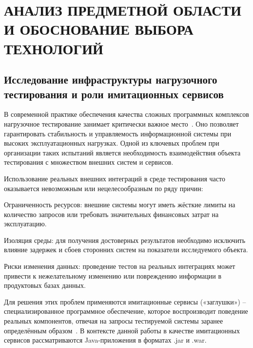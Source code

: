 ﻿\chapter{{\fontsize{14pt}{21pt}\selectfont\MakeUppercase{АНАЛИЗ ПРЕДМЕТНОЙ ОБЛАСТИ И ОБОСНОВАНИЕ ВЫБОРА ТЕХНОЛОГИЙ}}}
\label{cha:analysis}


\section{Исследование инфраструктуры нагрузочного тестирования и роли имитационных сервисов}

В современной практике обеспечения качества сложных программных комплексов нагрузочное тестирование занимает критически важное место~\cite{gost-56920-2024, kulikov-testing}. Оно позволяет гарантировать стабильность и управляемость информационной системы при высоких эксплуатационных нагрузках. Одной из ключевых проблем при организации таких испытаний является необходимость взаимодействия объекта тестирования с множеством внешних систем и сервисов.

Использование реальных внешних интеграций в среде тестирования часто оказывается невозможным или нецелесообразным по ряду причин:

\begin{compactlist}
\item Ограниченность ресурсов: внешние системы могут иметь жёсткие лимиты на количество запросов или требовать значительных финансовых затрат на эксплуатацию.
\item Изоляция среды: для получения достоверных результатов необходимо исключить влияние задержек и сбоев сторонних систем на показатели исследуемого объекта.
\item Риски изменения данных: проведение тестов на реальных интеграциях может привести к нежелательному изменению или повреждению информации в продуктовых базах данных.
\end{compactlist}

Для решения этих проблем применяются имитационные сервисы («заглушки») -- специализированное программное обеспечение, которое воспроизводит поведение реальных компонентов, отвечая на запросы тестируемой системы заранее определённым образом~\cite{newman-microservices}. В контексте данной работы в качестве имитационных сервисов рассматриваются Java-приложения в форматах .jar и .war.

